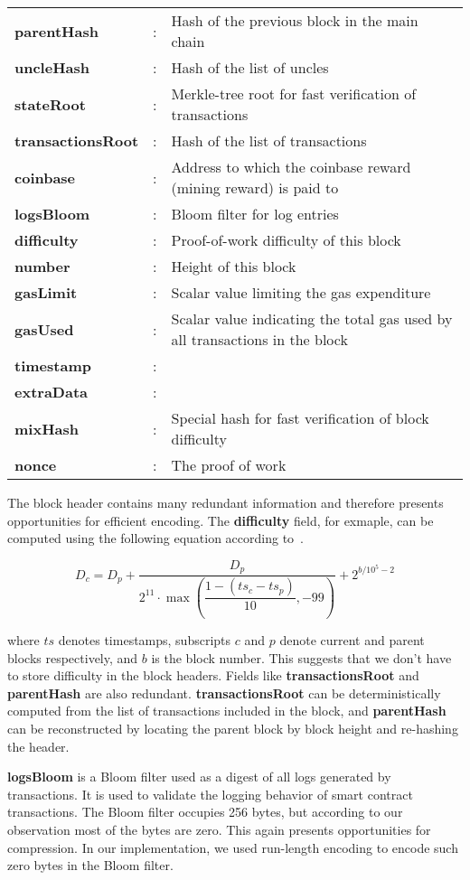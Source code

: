 \begin{table}[H]
	\centering
\begin{tabular}{>{\bfseries}l c l}
 parentHash&:& Hash of the previous block in the main chain\\
 uncleHash&:& Hash of the list of uncles\\
 stateRoot&:& Merkle-tree root for fast verification of transactions\\
 transactionsRoot&:& Hash of the list of transactions\\
 coinbase&:& Address to which the coinbase reward (mining reward) is paid to\\
 logsBloom&:& Bloom filter for log entries\\
 difficulty&:& Proof-of-work difficulty of this block\\
 number&:& Height of this block\\
 gasLimit&:& Scalar value limiting the gas expenditure\\
 gasUsed&:& Scalar value indicating the total gas used by all transactions in the block\\
 timestamp&:&\\
 extraData&:&\\
 mixHash&:& Special hash for fast verification of block difficulty\\
 nonce&:& The proof of work\\
\end{tabular}
\end{table}

The block header contains many redundant information and therefore presents opportunities for efficient encoding.
The \textbf{difficulty} field, for exmaple, can be computed using the following equation according to~\cite{ethereum}.

$$
D_{c} = D_{p} + \dfrac{D_{p}}{2^{11}\cdot\max\left(\dfrac{1 - (ts_{c} - ts_{p})}{10}, -99\right)} + 2^{b/10^5-2}
$$

where $ts$ denotes timestamps, subscripts $c$ and $p$ denote current and parent blocks respectively, and $b$ is the block number.
This suggests that we don't have to store difficulty in the block headers.
Fields like \textbf{transactionsRoot} and \textbf{parentHash} are also redundant.
\textbf{transactionsRoot} can be deterministically computed from the list of transactions included in the block,
and \textbf{parentHash} can be reconstructed by locating the parent block by block height and re-hashing the header.

\textbf{logsBloom} is a Bloom filter used as a digest of all logs generated by transactions.
It is used to validate the logging behavior of smart contract transactions. The Bloom filter occupies 256 bytes,
but according to our observation most of the bytes are zero. This again presents opportunities for compression.
In our implementation, we used run-length encoding to encode such zero bytes in the Bloom filter.

